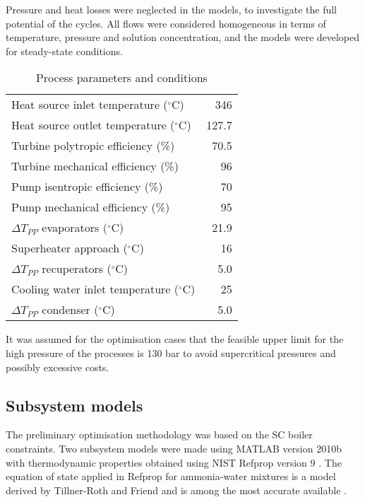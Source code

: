 \documentclass[review,3p]{elsarticle}
\begin{document}
Pressure and heat losses were neglected in the models, to investigate the full potential of the cycles. All flows were considered homogeneous in terms of temperature, pressure and solution concentration, and the models were developed for steady-state conditions.


\begin{table}
\centering
\caption{Process parameters and conditions}
%
\scriptsize
\begin{tabular}{lr}
\toprule
Heat source inlet temperature ($^\circ$C)  &        346 \\
Heat source outlet temperature ($^\circ$C)  &      127.7 \\
Turbine polytropic efficiency (\%) &          70.5 \\
Turbine mechanical efficiency (\%) &         96 \\
Pump isentropic efficiency (\%) &         70 \\
Pump mechanical efficiency (\%) &         95 \\
$\Delta T_{PP}$ evaporators ($^\circ$C)  &       21.9 \\
Superheater approach ($^\circ$C) &         16 \\
$\Delta T_{PP}$ recuperators ($^\circ$C)&        5.0 \\
Cooling water inlet temperature ($^\circ$C) &         25 \\
$\Delta T_{PP}$ condenser ($^\circ$C) &         5.0 \\


\bottomrule
\end{tabular}  
\label{tab:modelingConditions}
\end{table}


It was assumed for the optimisation cases that the feasible upper limit for the high pressure of the processes is 130 bar to avoid supercritical pressures and possibly excessive costs.


\subsection{Subsystem models}
\label{sec:subsystemModels}
The preliminary optimisation methodology was based on the SC boiler constraints. Two subsystem models were made using MATLAB\textsuperscript{\textregistered} version 2010b  \cite{Mathworks2010} with thermodynamic properties obtained using NIST Refprop version 9 \cite{Lemmon2010}. The equation of state applied in Refprop for ammonia-water mixtures is a model derived by Tillner-Roth and Friend \cite{TillnerRoth1998} and is among the most accurate available \cite{Zhang20125309}. 
\end{document}
